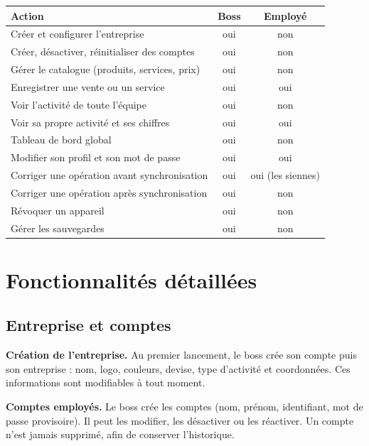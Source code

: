 \documentclass[11pt,a4paper]{article}
\newcommand{\fonc}[2]{\textbf{#1.} #2\par\vspace{0.2em}}
\begin{document}
	\begin{center}
		\small
		\begin{tabular}{p{6.2cm} c c}
			\toprule
			\textbf{Action} & \textbf{Boss} & \textbf{Employé} \\
			\midrule
			Créer et configurer l'entreprise & oui & non \\
			Créer, désactiver, réinitialiser des comptes & oui & non \\
			Gérer le catalogue (produits, services, prix) & oui & non \\
			Enregistrer une vente ou un service & oui & oui \\
			Voir l'activité de toute l'équipe & oui & non \\
			Voir sa propre activité et ses chiffres & oui & oui \\
			Tableau de bord global & oui & non \\
			Modifier son profil et son mot de passe & oui & oui \\
			Corriger une opération avant synchronisation & oui & oui (les siennes) \\
			Corriger une opération après synchronisation & oui & non \\
			Révoquer un appareil & oui & non \\
			Gérer les sauvegardes & oui & non \\
			\bottomrule
		\end{tabular}
	\end{center}
	
	\section{Fonctionnalités détaillées}
	
	\subsection{Entreprise et comptes}
	
	\fonc{Création de l'entreprise}{Au premier lancement, le boss crée son compte puis son entreprise : nom, logo, couleurs, devise, type d'activité et coordonnées. Ces informations sont modifiables à tout moment.}
	
	\fonc{Comptes employés}{Le boss crée les comptes (nom, prénom, identifiant, mot de passe provisoire). Il peut les modifier, les désactiver ou les réactiver. Un compte n'est jamais supprimé, afin de conserver l'historique.}
	
\end{document}
